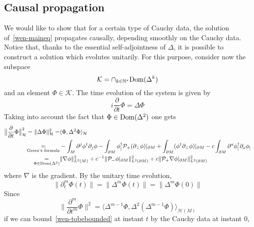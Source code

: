\subsection{Causal propagation}
We would like to show that for a certain type of Cauchy data, 
the solution of~\cref{wen-maineq} propagates causally, \ie depending smoothly on the Cauchy data.
Notice that, thanks to the essential self-adjointness of $\Delta$, 
it is possible to construct a solution which evolutes unitarily.
For this purpose, 
consider now the subspace
\begin{equation*}
\mathcal{K} = \cap_{k\in \mathbb{N}^*} \mathrm{Dom}(\Delta^k)
\end{equation*}
and an element $\Phi \in \mathcal{K}$.
The time evolution of the system is given by
\begin{equation*}
i \frac{\partial }{\partial t} \Phi = \Delta \Phi 
\end{equation*}
Taking into account the fact that $\Phi\in\mathrm{Dom}(\Delta^2)$ one gets
\begin{equation}\label{wen-tobebounded}
\begin{split}
\big\| \frac{\partial }{\partial t} \Phi \big\|^2_\mathcal{H} = \| \Delta \Phi \|^2_{\mathcal{H}}  = &
\langle \Phi, \Delta^2 \Phi \rangle_{\mathcal{H}}   \\ 
\underset{\textrm{Green's formula}}=
& - \int_M \partial^j \phi^\dagger \partial_j \phi 
 -  \int_{\partial M}\phi_|^\dagger \mathcal{P}_+(\partial_\bot \phi)\vert_{\partial M} 
 + \int_{\partial M} (\phi^\dagger \partial_\bot\phi)\vert_{\partial M}
- c\int_{\partial M} \partial^a \phi^\dagger_| \partial_a \phi_| \\
\underset{\Phi \in \mathrm{Dom}(\Delta^2)}{=} &
\|\nabla \phi \|^2_{L^2 (M)} + c^{-1} \| \mathcal{P}_- \phi\vert_{\partial M} \|^2_{L^2(\partial M)}
+ c \| \mathcal{P}_+ \nabla \phi\vert_{\partial M} \|^2_{L^2(\partial M)}
\end{split}
\end{equation}
where $\nabla$ is the gradient.
By the unitary time evolution, 
\begin{equation*}
\big\|\partial_t^m \Phi(t) \big\|= 
\big\|\Delta^m\Phi(t) \big\| =
\big\|\Delta^m \Phi(0) \big\|
\end{equation*} 
Since
\begin{equation*}
 \Big\|\frac{\partial^{m}}{\partial t^{m}} \Phi \Big\|^2 = 
 \langle \Delta^{m-1}\Phi, \Delta^{2}(\Delta^{m-1} \Phi )\rangle_{\mathcal{H}(M)} 
\end{equation*}
if we can bound~\cref{wen-tobebounded} at instant $t$ by the Cauchy data at instant $0$, 
